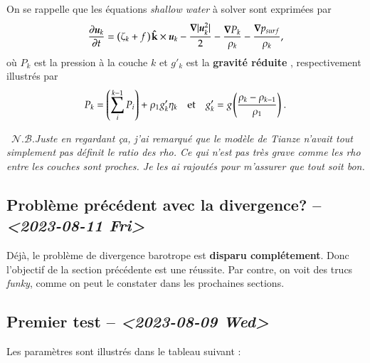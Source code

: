 \documentclass[10pt]{article}
\numberwithin{equation}{section}
\newcommand{\kvf}{\vb{\hat{k}}}
\newcommand{\uu}{\vb*{u}}
\newcommand{\pt}{\hspace{1pt}} %
\newcommand{\nb}{\raisebox{0.8pt}{\scriptsize\textleaf}\ $\mathscr{N. B.}$\hspace{4pt}}
\begin{document}
On se rappelle que les équations \emph{shallow water} à solver sont exprimées par
\begin{equation}
   \pdv{\uu_k}{t} = \qty(\zeta_k + f\pt) \pt \kvf\times\uu_k -\frac{\gradient|\uu_k^2|}{2}  -\frac{\gradient{P_k}}{\rho_k} - \frac{\gradient p_{surf}}{\rho_k},
\end{equation}
où \(P_k\) est la pression à la couche \(k\) et \(g'_k\) est la  \textbf{gravité réduite} , respectivement illustrés par 
\begin{align}
   && P_k = \qty(\sum_i^{k-1} P_i ) + \rho_1 g'_k \eta_k &&  \text{et} && g'_k = g \pt\qty(\frac{\rho_k - \rho_{k-1}}{\rho_1})\ . &&
\end{align}

\nb \emph{Juste en regardant ça, j'ai remarqué que le modèle de Tianze n'avait tout simplement pas définit le ratio des rho. Ce qui n'est pas très grave comme les rho entre les couches sont proches. Je les ai rajoutés pour m'assurer que tout soit bon.}\bigskip

\subsection{Problème précédent avec la divergence? -- \textit{<2023-08-11 Fri>}}
\label{sec:org717a7b7}
Déjà, le problème de divergence barotrope est \textbf{disparu complétement}.
Donc l'objectif de la section précédente est une réussite.
Par contre, on voit des trucs \emph{funky}, comme on peut le constater dans les prochaines sections.

\subsection{Premier test -- \textit{<2023-08-09 Wed>}}
\label{sec:org0bd07d4}

Les paramètres sont illustrés dans le tableau suivant :
\end{document}
